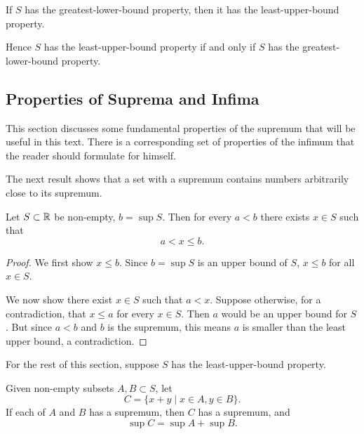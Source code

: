 \begin{corollary}
If $S$ has the greatest-lower-bound property, then it has the least-upper-bound property.

Hence $S$ has the least-upper-bound property if and only if $S$ has the greatest-lower-bound property.
\end{corollary}

\subsection{Properties of Suprema and Infima}
This section discusses some fundamental properties of the supremum that will be useful in this text. There is a corresponding set of properties of the infimum that the reader should formulate for himself.

The next result shows that a set with a supremum contains numbers arbitrarily close to its supremum.

\begin{proposition}\label{prop:sup-approx}
Let $S\subset\mathbb R$ be non-empty, $b=\sup S$. Then for every $a<b$ there exists $x\in S$ such that
\[a<x\le b.\]
\end{proposition}

\begin{proof}
We first show $x\le b$. Since $b=\sup S$ is an upper bound of $S$, $x\le b$ for all $x\in S$.

We now show there exist $x\in S$ such that $a<x$. Suppose otherwise, for a contradiction, that $x\le a$ for every $x\in S$. Then $a$ would be an upper bound for $S$. But since $a<b$ and $b$ is the supremum, this means $a$ is smaller than the least upper bound, a contradiction.
\end{proof}

For the rest of this section, suppose $S$ has the least-upper-bound property.

\begin{proposition}
Given non-empty subsets $A,B\subset S$, let
\[C=\{x+y\mid x\in A,y\in B\}.\]
If each of $A$ and $B$ has a supremum, then $C$ has a supremum, and
\[\sup C=\sup A+\sup B.\]
\end{proposition}

